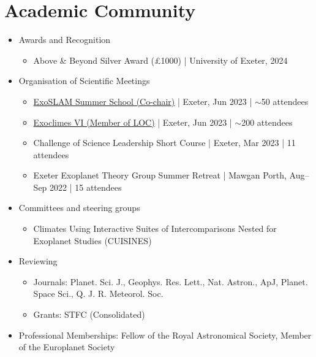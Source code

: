 \documentclass[a4paper, 11pt]{article}
\begin{document}
\section{Academic Community}
\begin{itemize}[nosep, leftmargin=10pt]
    \item Awards and Recognition
    \begin{itemize}
        \item Above \& Beyond Silver Award (\pounds\num{1000}) | University of Exeter, 2024
    \end{itemize}
    \item Organisation of Scientific Meetings
    \begin{itemize}
        \item \href{https://exoclimes.org/exoslam/index.html}{ExoSLAM Summer School (Co-chair)} | Exeter, Jun 2023 | $\sim$50 attendees
        \item \href{https://exoclimes.org}{Exoclimes VI (Member of LOC)} | Exeter, Jun 2023 | $\sim$200 attendees
        \item Challenge of Science Leadership Short Course | Exeter, Mar 2023 | 11 attendees
        \item Exeter Exoplanet Theory Group Summer Retreat | Mawgan Porth, Aug--Sep 2022 | 15 attendees
    \end{itemize}
    \item Committees and steering groups
    \begin{itemize}
        \item Climates Using Interactive Suites of Intercomparisons Nested for Exoplanet Studies (CUISINES)
    \end{itemize}
    \item Reviewing
    \begin{itemize}
        \item Journals: Planet. Sci. J., Geophys. Res. Lett., Nat. Astron., ApJ, Planet. Space Sci., Q. J. R. Meteorol. Soc.
        \item Grants: STFC (Consolidated)
    \end{itemize}
    \item Professional Memberships: Fellow of the Royal Astronomical Society, Member of the Europlanet Society
\end{itemize}
\end{document}
